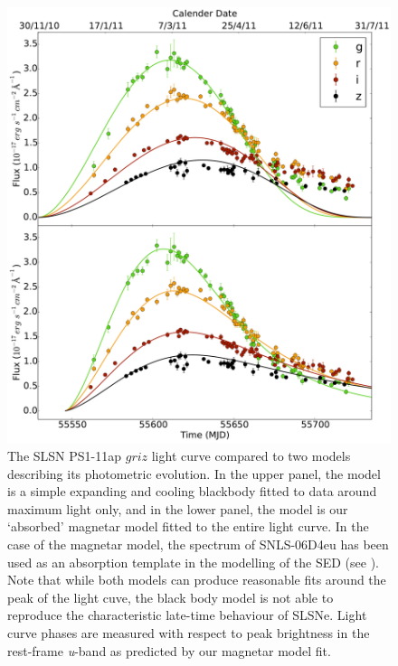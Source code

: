 \begin{figure}
\includegraphics[width=\textwidth]{Figures/Chapter3/BB_Mag_comp}
\caption{The SLSN PS1-11ap $griz$ light curve \citep{McCrum2014} compared to two models describing its photometric evolution. In the upper panel, the model is a simple expanding and cooling blackbody fitted to data around maximum light only, and in the lower panel, the model is our `absorbed' magnetar model fitted to the entire light curve. In the case of the magnetar model, the spectrum of SNLS-06D4eu \citep{Howell2013} has been used as an absorption template in the modelling of the SED (see ). Note that while both models can produce reasonable fits around the peak of the light cuve, the black body model is not able to reproduce the characteristic late-time behaviour of SLSNe. Light curve phases are measured with respect to peak brightness in the rest-frame \textit{u}-band as predicted by our magnetar model fit.}
\label{fig:BB_Mag}
\end{figure}

